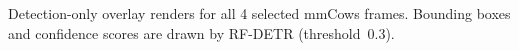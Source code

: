 \caption{Detection-only overlay renders for all 4 selected mmCows frames. Bounding boxes and confidence scores are drawn by RF-DETR (threshold~0.3).}\label{fig:detection-gallery-mmcows}

